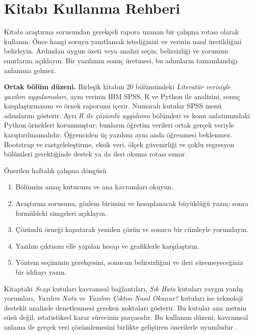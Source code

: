 \chapter*{Kitabı Kullanma Rehberi}

Kitabı araştırma sorusundan gerekçeli rapora uzanan bir çalışma rotası
olarak kullanın. Önce hangi soruyu yanıtlamak istediğinizi ve verinin nasıl
üretildiğini belirleyin. Ardından uygun özeti veya analizi seçin;
belirsizliği ve yorumun sınırlarını açıklayın. Bir yazılımın sonuç üretmesi,
bu adımların tamamlandığı anlamına gelmez.

\textbf{Ortak bölüm düzeni.} Birleşik kitabın 20 bölümündeki
\emph{Literatür verisiyle yazılım uygulamaları}, aynı verinin IBM SPSS,
R ve Python ile analizini, sonuç karşılaştırmasını ve örnek raporunu içerir.
Numaralı kutular SPSS menü adımlarını gösterir. Ayrı
\emph{R ile çözümlü uygulama} bölümleri ve konu anlatımındaki Python
örnekleri korunmuştur; bunların öğretim verileri ortak gerçek veriyle
karıştırılmamalıdır. Öğrenciden üç yazılımı aynı anda öğrenmesi beklenmez.
Bootstrap ve rastgeleleştirme, eksik veri, ölçek güvenirliği ve çoklu
regresyon bölümleri gerektiğinde destek ya da ileri okuma rotası sunar.

\begin{prismbox}[PrismLight]{Önerilen haftalık çalışma döngüsü}
\begin{enumerate}
  \item Bölümün amaç kutusunu ve ana kavramları okuyun.
  \item Araştırma sorusunu, gözlem birimini ve hesaplanacak büyüklüğü yazın; sonra formüldeki simgeleri açıklayın.
  \item Çözümlü örneği kapatarak yeniden çözün ve sonucu bir cümleyle yorumlayın.
  \item Yazılım çıktısını elle yapılan hesap ve grafiklerle karşılaştırın.
  \item Yöntem seçiminin gerekçesini, sonucun belirsizliğini ve ileri süremeyeceğiniz bir iddiayı yazın.
\end{enumerate}
\end{prismbox}

Kitaptaki \emph{Sezgi} kutuları kavramsal bağlantıları, \emph{Sık Hata}
kutuları yaygın yanlış yorumları, \emph{Yazılım Notu} ve
\emph{Yazılım Çıktısı Nasıl Okunur?} kutuları ise teknoloji destekli analizde
denetlenmesi gereken noktaları gösterir. Bu kutular ana metnin süsü değil,
istatistiksel karar sürecinin parçasıdır. Bu kullanım düzeni, kavramsal
anlama ile gerçek veri çözümlemesini birlikte geliştiren önerilerle uyumludur
\citep{gaise2016}.

